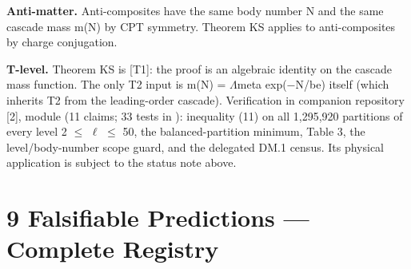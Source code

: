 \documentclass[11pt,letterpaper]{article}
\begin{document}
\noindent \textbf{Anti-matter. }Anti-composites have the same body number N and the same cascade mass m(N) by CPT symmetry. Theorem KS applies to anti-composites by charge conjugation.

\noindent \textbf{T-level. }Theorem KS is [T1]: the proof is an algebraic identity on the cascade mass function. The only T2 input is m(N) = $\Lambda$meta exp($-$N/be) itself (which inherits T2 from the leading-order cascade). Verification in companion repository [2], module  (11 claims; 33 tests in ): inequality (11) on all 1,295,920 partitions of every level 2 $\le$ $\ell$ $\le$ 50, the balanced-partition minimum, Table 3, the level/body-number scope guard, and the delegated DM.1 census. Its physical application is subject to the status note above.

\section*{9  Falsifiable Predictions --- Complete Registry}
\end{document}
